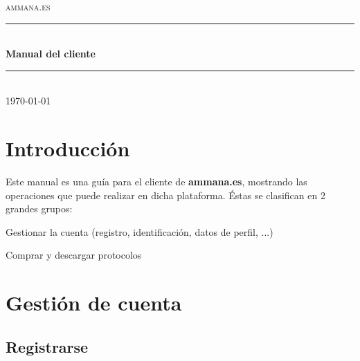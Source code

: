 \documentclass[12pt, spanish]{article}
\begin{document}

    \begin{titlepage}
        \newcommand { \HRule } { \rule {\linewidth} {0.5mm} }
        \center
        \textsc {\LARGE ammana.es} \\ [1.5cm]
        \HRule \\ [0.4cm]
        { \huge \bfseries Manual del cliente } \\ [0.4cm]
        \HRule \\ [1.5cm]
        { \large \today } \\ [3cm]
        \vfill
    \end{titlepage}


    \tableofcontents


    \newpage

    \section{Introducción}

        Este manual es una guía para el cliente de \textbf{ammana.es}, mostrando las operaciones
    que puede realizar en dicha plataforma. Éstas se clasifican en 2 grandes grupos:

        \begin{steps}
            \item Gestionar la cuenta (registro, identificación, datos de perfil, ...)
            \item Comprar y descargar protocolos
        \end{steps}


    \newpage

    \section{Gestión de cuenta}


    \subsection{Registrarse}
\end{document}
